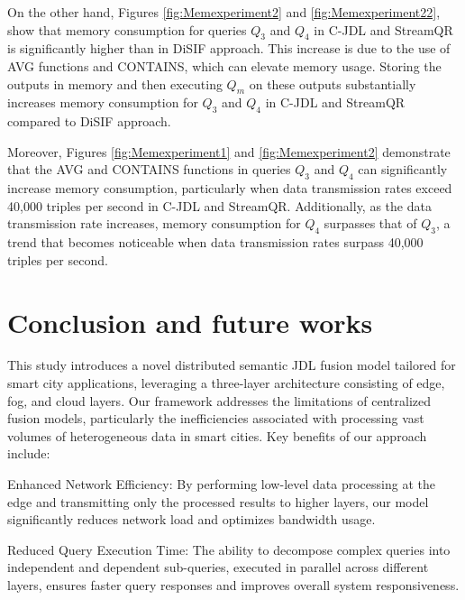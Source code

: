 \documentclass[5p,times]{elsarticle}
\begin{document}
On the other hand, Figures \ref{fig:Memexperiment2} and \ref{fig:Memexperiment22}, show that memory consumption
 for queries $Q_3$ and $Q_4$ in C-JDL and StreamQR is significantly higher than 
 in DiSIF approach. This increase is due to the use of AVG functions 
 and CONTAINS, which can elevate memory usage. Storing the outputs in
  memory and then executing $Q_m$ on these outputs substantially increases memory
   consumption for $Q_3$ and $Q_4$ in C-JDL and StreamQR compared
    to DiSIF approach.


Moreover, Figures \ref{fig:Memexperiment1} and \ref{fig:Memexperiment2} demonstrate
 that the AVG and CONTAINS functions in queries $Q_3$ and $Q_4$ can significantly
  increase memory consumption, particularly when data transmission rates exceed 40,000
   triples per second in C-JDL and StreamQR. Additionally, as the data transmission rate
    increases, memory consumption for $Q_4$ surpasses that of $Q_3$, a trend that becomes
     noticeable when data transmission rates surpass 40,000 triples per second.

%

\section{Conclusion and future works}
This study introduces a novel distributed semantic JDL fusion model tailored for smart city applications, leveraging a three-layer architecture consisting of edge, fog, and cloud layers. Our framework addresses the limitations of centralized fusion models, particularly the inefficiencies associated with processing vast volumes of heterogeneous data in smart cities. Key benefits of our approach include: 

Enhanced Network Efficiency: By performing low-level data processing at the edge and transmitting only the processed results to higher layers, our model significantly reduces network load and optimizes bandwidth usage.

Reduced Query Execution Time: The ability to decompose complex queries into independent and dependent sub-queries, executed in parallel across different layers, ensures faster query responses and improves overall system responsiveness. 
\end{document}
